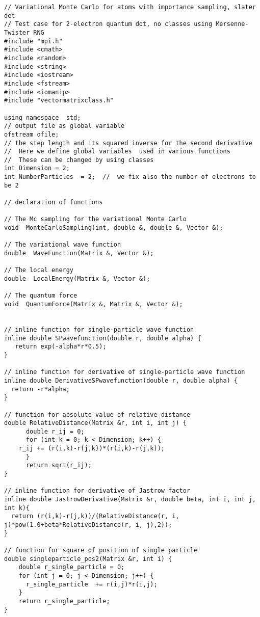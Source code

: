 \documentclass[%
oneside,                 %
final,                   %
10pt]{article}
\begin{document}
\begin{verbatim}
// Variational Monte Carlo for atoms with importance sampling, slater det
// Test case for 2-electron quantum dot, no classes using Mersenne-Twister RNG
#include "mpi.h"
#include <cmath>
#include <random>
#include <string>
#include <iostream>
#include <fstream>
#include <iomanip>
#include "vectormatrixclass.h"

using namespace  std;
// output file as global variable
ofstream ofile;  
// the step length and its squared inverse for the second derivative 
//  Here we define global variables  used in various functions
//  These can be changed by using classes
int Dimension = 2; 
int NumberParticles  = 2;  //  we fix also the number of electrons to be 2

// declaration of functions 

// The Mc sampling for the variational Monte Carlo 
void  MonteCarloSampling(int, double &, double &, Vector &);

// The variational wave function
double  WaveFunction(Matrix &, Vector &);

// The local energy 
double  LocalEnergy(Matrix &, Vector &);

// The quantum force
void  QuantumForce(Matrix &, Matrix &, Vector &);


// inline function for single-particle wave function
inline double SPwavefunction(double r, double alpha) { 
   return exp(-alpha*r*0.5);
}

// inline function for derivative of single-particle wave function
inline double DerivativeSPwavefunction(double r, double alpha) { 
  return -r*alpha;
}

// function for absolute value of relative distance
double RelativeDistance(Matrix &r, int i, int j) { 
      double r_ij = 0;  
      for (int k = 0; k < Dimension; k++) { 
	r_ij += (r(i,k)-r(j,k))*(r(i,k)-r(j,k));
      }
      return sqrt(r_ij); 
}

// inline function for derivative of Jastrow factor
inline double JastrowDerivative(Matrix &r, double beta, int i, int j, int k){
  return (r(i,k)-r(j,k))/(RelativeDistance(r, i, j)*pow(1.0+beta*RelativeDistance(r, i, j),2));
}

// function for square of position of single particle
double singleparticle_pos2(Matrix &r, int i) { 
    double r_single_particle = 0;
    for (int j = 0; j < Dimension; j++) { 
      r_single_particle  += r(i,j)*r(i,j);
    }
    return r_single_particle;
}


\end{verbatim}
\end{document}
